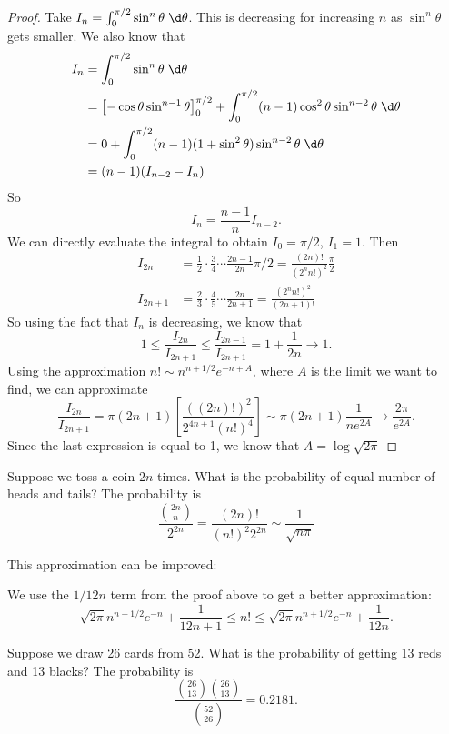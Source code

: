 \documentclass[a4paper]{article}
\begin{document}
\begin{proof}
  Take $I_n = \int_0^{\pi/2} \sin^n\theta\;\d \theta$. This is decreasing for increasing $n$ as $\sin^n\theta$ gets smaller. We also know that
  \begin{align*}
    I_n &= \int_0^{\pi/2}\sin^n \theta\;\d \theta\\
    &= \left[-\cos\theta\sin^{n - 1}\theta \right]_0^{\pi/2} + \int_0^{\pi/2} (n - 1)\cos^2\theta \sin^{n - 2}\theta \;\d\theta\\
    &= 0 + \int_0^{\pi/2}(n - 1)(1 + \sin^2 \theta)\sin^{n - 2}\theta \;\d \theta\\
    &= (n - 1)(I_{n - 2} - I_n)
  \end{align*}
  So
  \[
    I_n = \frac{n - 1}{n}I_{n - 2}.
  \]
  We can directly evaluate the integral to obtain $I_0 = \pi/2$, $I_1 = 1$. Then
  \begin{align*}
    I_{2n} &= \frac{1}{2}\cdot\frac{3}{4}\cdots \frac{2n - 1}{2n} \pi/2 = \frac{(2n)!}{(2^nn!)^2}\frac{\pi}{2}\\
    I_{2n + 1} &= \frac{2}{3}\cdot\frac{4}{5}\cdots\frac{2n}{2n + 1} = \frac{(2^nn!)^2}{(2n + 1)!}
  \end{align*}
  So using the fact that $I_n$ is decreasing, we know that
  \[
    1 \leq \frac{I_{2n}}{I_{2n + 1}} \leq \frac{I_{2n - 1}}{I_{2n + 1}} = 1 + \frac{1}{2n} \to 1.
  \]
  Using the approximation $n!\sim n^{n + 1/2}e^{-n + A}$, where $A$ is the limit we want to find, we can approximate
  \[
    \frac{I_{2n}}{I_{2n + 1}} = \pi(2n + 1)\left[\frac{( (2n)!)^2}{2^{4n + 1}(n!)^4}\right] \sim \pi(2n + 1)\frac{1}{ne^{2A}}\to \frac{2\pi}{e^{2A}}.
  \]
  Since the last expression is equal to 1, we know that $A = \log\sqrt{2\pi}$
\end{proof}

\begin{eg}
  Suppose we toss a coin $2n$ times. What is the probability of equal number of heads and tails? The probability is
  \[
    \frac{\binom{2n}{n}}{2^{2n}} = \frac{(2n)!}{(n!)^2 2^{2n}} \sim \frac{1}{\sqrt{n\pi}}
  \]
\end{eg}

This approximation can be improved:
\begin{prop}
  We use the $1/12n$ term from the proof above to get a better approximation:
  \[
    \sqrt{2\pi}n^{n + 1/2}e^{-n} + \frac{1}{12n + 1} \leq n! \leq \sqrt{2\pi} n^{n + 1/2} e^{-n} + \frac{1}{12n}.
  \]
\end{prop}

\begin{eg}
  Suppose we draw 26 cards from 52. What is the probability of getting 13 reds and 13 blacks? The probability is
  \[
    \frac{\binom{26}{13}\binom{26}{13}}{\binom{52}{26}} = 0.2181.
  \]
\end{eg}
\end{document}
